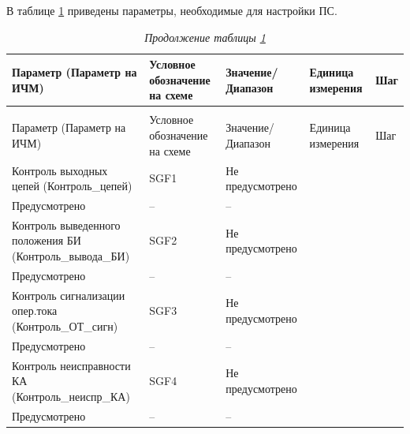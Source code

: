 \par
В таблице \ref{ps:tbl1} приведены параметры, необходимые для настройки ПС. 

\footnotesize
\begin{longtable}{|>{\centering\arraybackslash}m{5.3cm}|>{\centering\arraybackslash}m{3.3cm}|>{\centering\arraybackslash}m{4.2cm}|>{\centering\arraybackslash}m{1.8cm}|>{\centering\arraybackslash}m{1cm}|}
\caption{Параметры для настройки функции «ПС»\hfill\vspace{-0.5\baselineskip}}\label{ps:tbl1}\\ 
\hline
\rowcolor{unimain!40}
Параметр (Параметр на ИЧМ) & Условное обозначение на схеме & Значение/ Диапазон & Единица измерения & Шаг \\ 
\hline
\endfirsthead
\caption*{\hspace{3pt}\emph{Продолжение таблицы \ref{ps:tbl1}\hfill\vspace{-0.5\baselineskip}}} \\ %
\hline
\rowcolor{unimain!40}
Параметр (Параметр на ИЧМ) & Условное обозначение на схеме & Значение/ Диапазон & Единица измерения & Шаг \\ 
\endhead
\endfoot
\endlastfoot
\centering Контроль выходных цепей (Контроль\_цепей)  & \centering SGF1 & \centering Не предусмотрено \\ Предусмотрено & \centering -- & \centering \arraybackslash -- \\
\hline
\centering Контроль выведенного положения БИ (Контроль\_вывода\_БИ)  & \centering SGF2 & \centering Не предусмотрено \\ Предусмотрено & \centering -- & \centering \arraybackslash -- \\
\hline
\centering Контроль сигнализации опер.тока (Контроль\_ОТ\_сигн)  & \centering SGF3 & \centering Не предусмотрено \\ Предусмотрено & \centering -- & \centering \arraybackslash -- \\
\hline
\centering Контроль неисправности КА (Контроль\_неиспр\_КА)  & \centering SGF4 & \centering Не предусмотрено \\ Предусмотрено & \centering -- & \centering \arraybackslash -- \\

\end{longtable}
